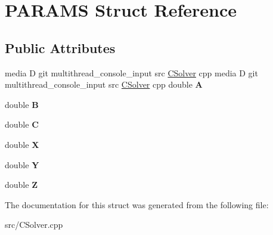 \hypertarget{struct_p_a_r_a_m_s}{
\section{PARAMS Struct Reference}
\label{struct_p_a_r_a_m_s}
}
\subsection*{Public Attributes}
\begin{DoxyCompactItemize}
\item 
\hypertarget{struct_p_a_r_a_m_s_ae7049eab7b50b71e680f8687407fee17}{
media D git multithread\_\-console\_\-input src \hyperlink{class_c_solver}{CSolver} cpp media D git multithread\_\-console\_\-input src \hyperlink{class_c_solver}{CSolver} cpp double {\bfseries A}}
\label{struct_p_a_r_a_m_s_ae7049eab7b50b71e680f8687407fee17}

\item 
\hypertarget{struct_p_a_r_a_m_s_a72d1294912c7664f99febb5508546888}{
double {\bfseries B}}
\label{struct_p_a_r_a_m_s_a72d1294912c7664f99febb5508546888}

\item 
\hypertarget{struct_p_a_r_a_m_s_a95f765e4c32008db825ccab4e21f15ef}{
double {\bfseries C}}
\label{struct_p_a_r_a_m_s_a95f765e4c32008db825ccab4e21f15ef}

\item 
\hypertarget{struct_p_a_r_a_m_s_a00cd6744c0b3abfa7d961a7daa18aceb}{
double {\bfseries X}}
\label{struct_p_a_r_a_m_s_a00cd6744c0b3abfa7d961a7daa18aceb}

\item 
\hypertarget{struct_p_a_r_a_m_s_ab841f0bc0a7fbc3d7ae90a78d46c6414}{
double {\bfseries Y}}
\label{struct_p_a_r_a_m_s_ab841f0bc0a7fbc3d7ae90a78d46c6414}

\item 
\hypertarget{struct_p_a_r_a_m_s_a84b0745ee7e2b94b5d31e9fafa57d2a5}{
double {\bfseries Z}}
\label{struct_p_a_r_a_m_s_a84b0745ee7e2b94b5d31e9fafa57d2a5}

\end{DoxyCompactItemize}


The documentation for this struct was generated from the following file:\begin{DoxyCompactItemize}
\item 
src/CSolver.cpp\end{DoxyCompactItemize}
